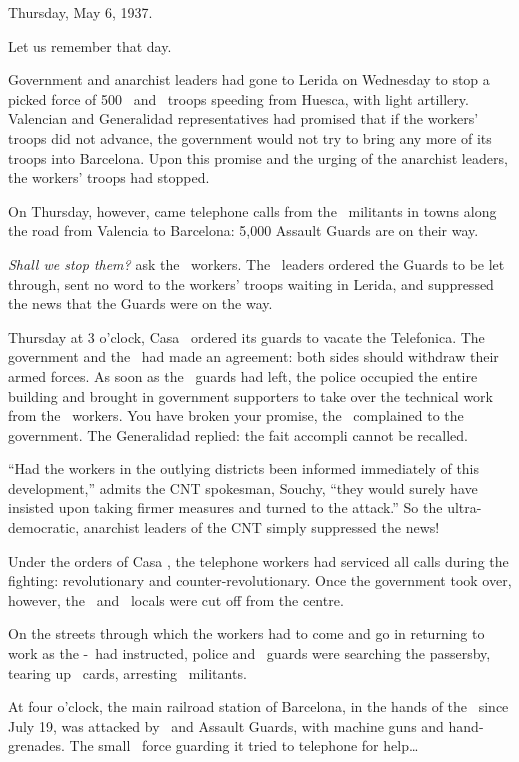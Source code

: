 Thursday, May 6, 1937.
 
Let us remember that day.

Government and anarchist leaders had gone to Lerida on Wednesday to stop a picked force of 500 \POUM\ and \CNT\ troops speeding from Huesca, with light artillery. Valencian and Generalidad representatives had promised that if the workers’ troops did not advance, the government would not try to bring any more of its troops into Barcelona. Upon this promise and the urging of the anarchist leaders, the workers’ troops had stopped.

On Thursday, however, came telephone calls from the \CNT\ militants in towns along the road from Valencia to Barcelona: 5,000 Assault Guards are on their way.

\emph{Shall we stop them?} ask the \CNT\ workers. The \CNT\ leaders ordered the Guards to be let through, sent no word to the workers’ troops waiting in Lerida, and suppressed the news that the Guards were on the way.

Thursday at 3 o’clock, Casa \CNT\ ordered its guards to vacate the Telefonica. The government and the \CNT\ had made an agreement: both sides should withdraw their armed forces. As soon as the \CNT\ guards had left, the police occupied the entire building and brought in government supporters to take over the technical work from the \CNT\ workers. You have broken your promise, the \CNT\ complained to the government. The Generalidad replied: the fait accompli cannot be recalled.

``Had the workers in the outlying districts been informed immediately of this development,'' admits the CNT spokesman, Souchy, ``they would surely have insisted upon taking firmer measures and turned to the attack.'' So the ultra-democratic, anarchist leaders of the CNT simply suppressed the news!
\noclub

Under the orders of Casa \CNT, the telephone workers had serviced all calls during the fighting: revolutionary and counter-revolutionary. Once the government took over, however, the \FAI\ and \CNT\ locals were cut off from the centre.

On the streets through which the workers had to come and go in returning to work as the \CNT-\UGT\ had instructed, police and \PSUC\ guards were searching the passersby, tearing up \CNT\ cards, arresting \CNT\ militants.

At four o’clock, the main railroad station of Barcelona, in the hands of the \CNT\ since July 19, was attacked by \PSUC\ and Assault Guards, with machine guns and hand-grenades. The small \CNT\ force guarding it tried to telephone for help\dots


